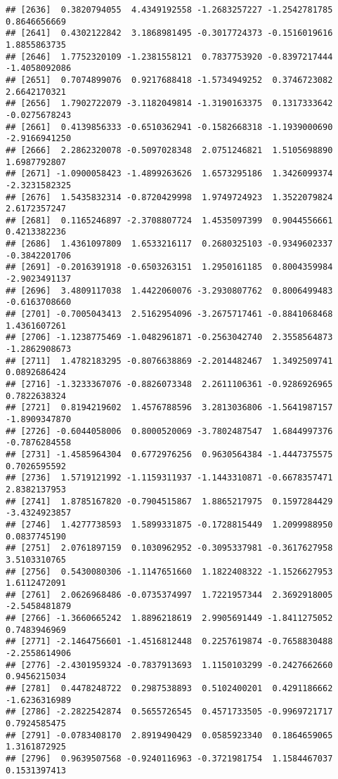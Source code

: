 \documentclass[
]{article}
\begin{document}
\begin{verbatim}
## [2636]  0.3820794055  4.4349192558 -1.2683257227 -1.2542781785  0.8646656669
## [2641]  0.4302122842  3.1868981495 -0.3017724373 -0.1516019616  1.8855863735
## [2646]  1.7752320109 -1.2381558121  0.7837753920 -0.8397217444 -1.4058092086
## [2651]  0.7074899076  0.9217688418 -1.5734949252  0.3746723082  2.6642170321
## [2656]  1.7902722079 -3.1182049814 -1.3190163375  0.1317333642 -0.0275678243
## [2661]  0.4139856333 -0.6510362941 -0.1582668318 -1.1939000690 -2.9166941250
## [2666]  2.2862320078 -0.5097028348  2.0751246821  1.5105698890  1.6987792807
## [2671] -1.0900058423 -1.4899263626  1.6573295186  1.3426099374 -2.3231582325
## [2676]  1.5435832314 -0.8720429998  1.9749724923  1.3522079824  2.6172357247
## [2681]  0.1165246897 -2.3708807724  1.4535097399  0.9044556661  0.4213382236
## [2686]  1.4361097809  1.6533216117  0.2680325103 -0.9349602337 -0.3842201706
## [2691] -0.2016391918 -0.6503263151  1.2950161185  0.8004359984 -2.9023491137
## [2696]  3.4809117038  1.4422060076 -3.2930807762  0.8006499483 -0.6163708660
## [2701] -0.7005043413  2.5162954096 -3.2675717461 -0.8841068468  1.4361607261
## [2706] -1.1238775469 -1.0482961871 -0.2563042740  2.3558564873 -1.2862908673
## [2711]  1.4782183295 -0.8076638869 -2.2014482467  1.3492509741  0.0892686424
## [2716] -1.3233367076 -0.8826073348  2.2611106361 -0.9286926965  0.7822638324
## [2721]  0.8194219602  1.4576788596  3.2813036806 -1.5641987157 -1.8909347870
## [2726] -0.6044058006  0.8000520069 -3.7802487547  1.6844997376 -0.7876284558
## [2731] -1.4585964304  0.6772976256  0.9630564384 -1.4447375575  0.7026595592
## [2736]  1.5719121992 -1.1159311937 -1.1443310871 -0.6678357471  2.8382137953
## [2741]  1.8785167820 -0.7904515867  1.8865217975  0.1597284429 -3.4324923857
## [2746]  1.4277738593  1.5899331875 -0.1728815449  1.2099988950  0.0837745190
## [2751]  2.0761897159  0.1030962952 -0.3095337981 -0.3617627958  3.5103310765
## [2756]  0.5430080306 -1.1147651660  1.1822408322 -1.1526627953  1.6112472091
## [2761]  2.0626968486 -0.0735374997  1.7221957344  2.3692918005 -2.5458481879
## [2766] -1.3660665242  1.8896218619  2.9905691449 -1.8411275052  0.7483946969
## [2771] -2.1464756601 -1.4516812448  0.2257619874 -0.7658830488 -2.2558614906
## [2776] -2.4301959324 -0.7837913693  1.1150103299 -0.2427662660  0.9456215034
## [2781]  0.4478248722  0.2987538893  0.5102400201  0.4291186662 -1.6236316989
## [2786] -2.2822542874  0.5655726545  0.4571733505 -0.9969721717  0.7924585475
## [2791] -0.0783408170  2.8919490429  0.0585923340  0.1864659065  1.3161872925
## [2796]  0.9639507568 -0.9240116963 -0.3721981754  1.1584467037  0.1531397413

\end{verbatim}
\end{document}
